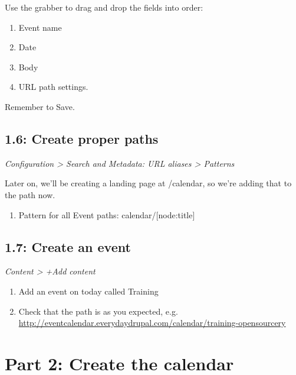 \documentclass[letterpaper,10pt,english]{sphinxmanual}
\begin{document}
Use the grabber to drag and drop the fields into order:
\begin{enumerate}
\item {} 
Event name

\item {} 
Date

\item {} 
Body

\item {} 
URL path settings.

\end{enumerate}

Remember to Save.


\subsection{1.6: Create proper paths}
\label{event_calendar:create-proper-paths}
\emph{Configuration \textgreater{} Search and Metadata: URL aliases \textgreater{} Patterns}

Later on, we'll be creating a landing page at /calendar, so we're adding that to the path now.
\begin{enumerate}
\item {} 
Pattern for all Event paths: calendar/{[}node:title{]}

\end{enumerate}


\subsection{1.7: Create an event}
\label{event_calendar:create-an-event}
\emph{Content \textgreater{} +Add content}
\begin{enumerate}
\item {} 
Add an event on today called Training

\item {} 
Check that the path is as you expected, e.g. \href{http://eventcalendar.everydaydrupal.com/calendar/training-opensourcery}{http://eventcalendar.everydaydrupal.com/calendar/training-opensourcery}

\end{enumerate}


\section{Part 2: Create the calendar}
\label{event_calendar:part-2-create-the-calendar}
\end{document}
